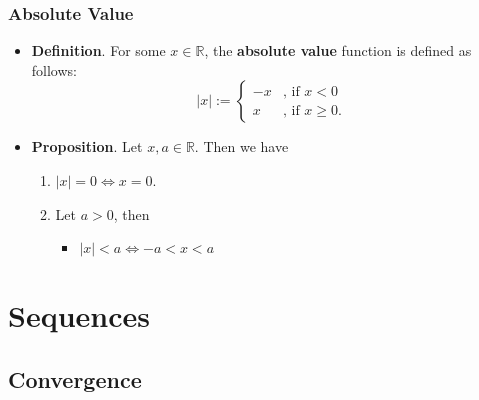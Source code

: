 \documentclass{article}
\newcommand{\R}{\mathbb{R}}
\newcommand{\?}{\stackrel{?}{=}}
\newcommand{\smallblacksquare}{\rule{0.5em}{0.5em}}
\begin{document}
\subsubsection*{Absolute Value}

\begin{itemize}
    \item \textbf{Definition}. For some $x \in \R$, the \textbf{absolute value} function is defined as follows:
    \[ |x| := \begin{cases}
        -x & \text{, if } x < 0 \\
        x & \text{, if } x \geq 0.
    \end{cases} \]
    \item \textbf{Proposition}. Let $x, a \in \R$. Then we have
    \begin{enumerate}[label=(\roman*)]
        \item $|x| = 0 \iff x = 0$.
        \item Let $a > 0$, then
        \begin{itemize}[label=\smallblacksquare]
            \item $|x| < a \iff -a < x < a$
        \end{itemize}
    \end{enumerate}
\end{itemize}

\section*{Sequences}

\subsection*{Convergence}
\end{document}
